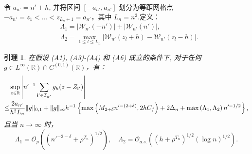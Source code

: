 \documentclass[a4paper,openay,14pt]{ctexbook}
\newtheorem{lem}{引理}
\numberwithin{equation}{section}
\numberwithin{lem}{section}
\begin{document}
令 $a_{n'} = n'+h$, 并将区间 $[-a_{n'}, a_{n'}] $ 划分为等距网格点 $-a_{n'} = z_1 < \dots < z_{L_n+1} = a_{n'}$，其中 $L_n = n^2$.定义：
\begin{align}\label{EQ:Lamda1}
    &\Lambda_1 = \left\vert \mathcal{W}_{n'}(-n')\right\vert+ \left\vert \mathcal{W}_{n'}(n')\right\vert, \\ 
    &\Lambda_2 = \max_{1\leq l\leq L_n}\left\vert \mathcal{W}_{n'}(z_l + h) - \mathcal{W}_{n'}(z_l-h)\right\vert. \label{EQ:Lamda2}
\end{align}

\begin{lem}\label{Lemma:g_h}
    在假设 (A1), (A3)-(A4) 和 (A6) 成立的条件下, 对于任何 $g \in L^{\infty}(\mathbb{R}) \cap C^{(0,1)}(\mathbb{R})$，有：
    \begin{align}\label{EQ:g_h}
        &\sup_{z\in\mathbb{R}}\left\vert n'^{-1}\sum_{\mathbf{i}'\in\mathcal{I}_{n'}}g_h(z-Z_{\mathbf{i}'})\right\vert \notag \\
        \leq& \frac{2a_{n'}}{h^2L_{n}}\Vert g\Vert_{0,1} + \Vert g\Vert_{\infty}h^{-1}\left\{\max \left( M_{2+\delta}n'^{-(2+\delta)}, 2hC_f \right ) + 2\Delta_n + \max\left({\Lambda_1},{\Lambda_2}\right) n'^{-1/2}\right\},
    \end{align}
    且当 $n \to \infty$ 时，
    \[ \Lambda_1 = \mathcal{O}_{p}\left(\left(n'^{-2-\delta}+\rho^{T_n}\right)^{1/2}\right), \quad \Lambda_2 = \mathcal{O}_{a.s.}\left(\left(h+\rho^{T_n}\right)^{1/2}\left(\log n\right)^{1/2}\right). \]
\end{lem}
\end{document}
